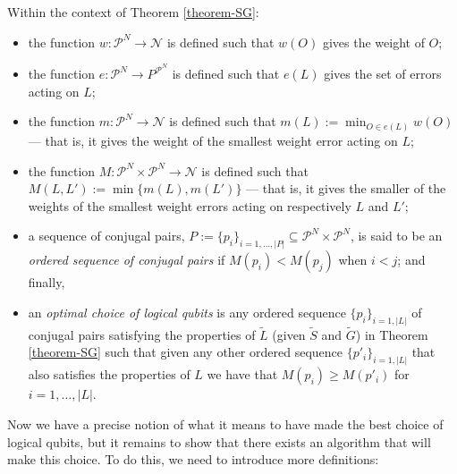 \documentclass[twocolumn,showpacs,preprintnumbers,amsmath,amssymb,nofootinbib,pra,floatfix]{revtex4}
\newenvironment{definition}[1][Definition]{\begin{trivlist}
\item[\hskip \labelsep {\bfseries #1}]}{\end{trivlist}}
\newcommand{\set}{\tilde}
\begin{document}
\begin{definition}
Within the context of Theorem \ref{theorem-SG}:
\begin{itemize}
\item the function $w:\mathscr{P}^N\to \mathscr{N}$ is defined such that $w(O)$ gives the weight of $O$;
\item the function $e:\mathscr{P}^N\to P^{\mathscr{P}^N}$ is defined such that $e(L)$ gives the set of errors acting on $L$;
\item the function $m:\mathscr{P}^N\to \mathscr{N}$ is defined such that $m(L):=\min_{O\in e(L)} w(O)$ --- that is, it gives the weight of the smallest weight error acting on $L$;
\item the function $M:\mathscr{P}^N\times\mathscr{P}^N \to \mathscr{N}$ is defined such that $M(L,L'):=\min \{m(L),m(L')\}$ --- that is, it gives the smaller of the weights of the smallest weight errors acting on respectively $L$ and $L'$;
\item a sequence of conjugal pairs, $P:=\{p_i\}_{i=1,\dots,|P|}\subseteq \mathscr{P}^N\times\mathscr{P}^N$, is said to be an \emph{ordered sequence of conjugal pairs} if $M(p_i) < M(p_j)$ when $i<j$; and finally,
\item an \emph{optimal choice of logical qubits} is any ordered sequence $\{p_i\}_{i=1,|L|}$ of conjugal pairs satisfying the properties of $\set L$ (given $\set S$ and $\set G$) in Theorem \ref{theorem-SG} such that given any other ordered sequence $\{p'_i\}_{i=1,|L|}$ that also satisfies the properties of $L$ we have that $M(p_i)\ge M(p'_i)$ for $i=1,\dots,|L|$.
\end{itemize}
\end{definition}

Now we have a precise notion of what it means to have made the best choice of logical qubits, but it remains to show that there exists an algorithm that will make this choice.  To do this, we need to introduce more definitions:

\begin{definition}

\end{definition}

\end{document}

